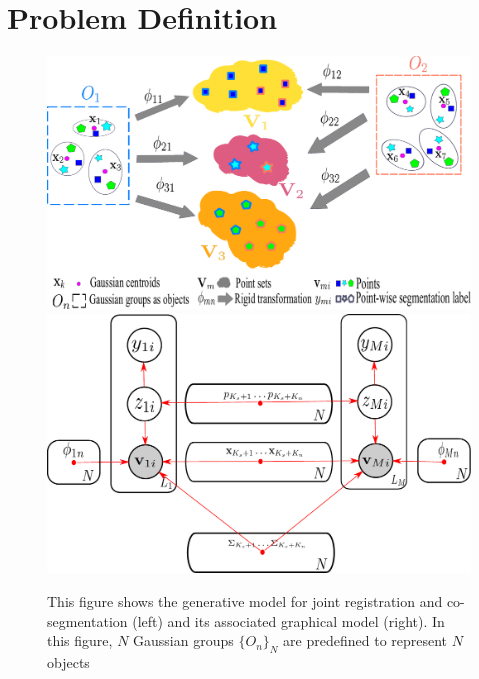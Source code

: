 \section{Problem Definition}
\label{sec:method}


\begin{figure}[htb]
	\centering
	\includegraphics[width=0.45\linewidth]{images/formulation}
	\hspace{0.1\linewidth}
	\includegraphics[width=0.40\linewidth]{images/formulation2}
	\caption{This figure shows the generative model for joint registration and co-segmentation (left) and its associated graphical model (right). In this figure, $N$ Gaussian groups $\{O_n\}_N$ are predefined to represent $N$ objects } 
	\label{fig:formulation}
\end{figure}

